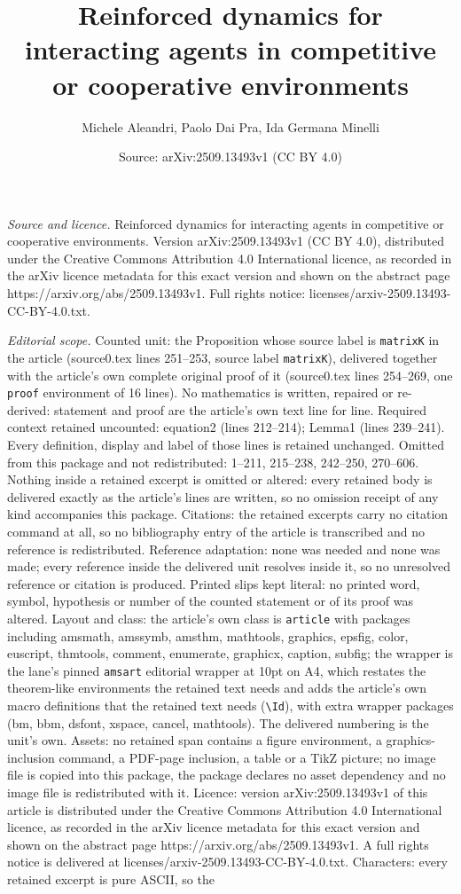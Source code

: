 \documentclass[10pt,a4paper]{amsart}
\title[Reinforced dynamics for interacting agents in competitive or]{Reinforced dynamics for interacting agents in competitive or cooperative environments}
\author{Michele Aleandri, Paolo Dai Pra, Ida Germana Minelli}
\date{Source: arXiv:2509.13493v1 (CC BY 4.0)}
\begin{document}
\maketitle

\noindent\emph{Source and licence.} Reinforced dynamics for interacting agents in competitive or cooperative environments. Version arXiv:2509.13493v1 (CC BY 4.0), distributed under the Creative Commons Attribution 4.0 International licence, as recorded in the arXiv licence metadata for this exact version and shown on the abstract page https://arxiv.org/abs/2509.13493v1. Full rights notice: licenses/arxiv-2509.13493-CC-BY-4.0.txt.\par\smallskip

\noindent\textit{Editorial scope.} Counted unit: the Proposition whose source label is \texttt{matrixK} in the article (source0.tex lines 251--253, source label \texttt{matrixK}), delivered together with the article's own complete original proof of it (source0.tex lines 254--269, one \texttt{proof} environment of 16 lines). No mathematics is written, repaired or re-derived: statement and proof are the article's own text line for line. Required context retained uncounted: equation2 (lines 212--214); Lemma1 (lines 239--241). Every definition, display and label of those lines is retained unchanged. Omitted from this package and not redistributed: 1--211, 215--238, 242--250, 270--606. Nothing inside a retained excerpt is omitted or altered: every retained body is delivered exactly as the article's lines are written, so no omission receipt of any kind accompanies this package. Citations: the retained excerpts carry no citation command at all, so no bibliography entry of the article is transcribed and no reference is redistributed. Reference adaptation: none was needed and none was made; every reference inside the delivered unit resolves inside it, so no unresolved reference or citation is produced. Printed slips kept literal: no printed word, symbol, hypothesis or number of the counted statement or of its proof was altered. Layout and class: the article's own class is \texttt{article} with packages including amsmath, amssymb, amsthm, mathtools, graphics, epsfig, color, euscript, thmtools, comment, enumerate, graphicx, caption, subfig; the wrapper is the lane's pinned \texttt{amsart} editorial wrapper at 10pt on A4, which restates the theorem-like environments the retained text needs and adds the article's own macro definitions that the retained text needs (\texttt{\textbackslash Id}), with extra wrapper packages (bm, bbm, dsfont, xspace, cancel, mathtools). The delivered numbering is the unit's own. Assets: no retained span contains a figure environment, a graphics-inclusion command, a PDF-page inclusion, a table or a TikZ picture; no image file is copied into this package, the package declares no asset dependency and no image file is redistributed with it. Licence: version arXiv:2509.13493v1 of this article is distributed under the Creative Commons Attribution 4.0 International licence, as recorded in the arXiv licence metadata for this exact version and shown on the abstract page https://arxiv.org/abs/2509.13493v1. A full rights notice is delivered at licenses/arxiv-2509.13493-CC-BY-4.0.txt. Characters: every retained excerpt is pure ASCII, so the 
\end{document}
